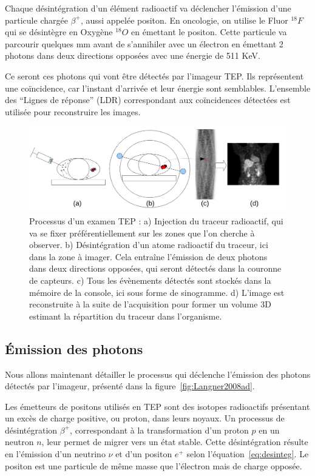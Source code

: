 Chaque désintégration d'un élément radioactif va déclencher l'émission d'une particule chargée $\beta^+$, aussi appelée positon. En oncologie, on utilise le Fluor $^{18}F$ qui se désintègre en Oxygène $^{18}O$ en émettant le positon. Cette particule va parcourir quelques mm avant de s'annihiler avec un électron en émettant 2 photons dans deux directions opposées avec une énergie de 511 KeV.

Ce seront ces photons qui vont être détectés par l'imageur TEP. Ils représentent une coïncidence, car l'instant d'arrivée et leur énergie sont semblables. L'ensemble des ``Lignes de réponse'' (LDR) correspondant aux coïncidences détectées est utilisée pour reconstruire les images.

\begin{figure}
\centering
\includegraphics[width=16cm]{images/schemaTEP}
\caption[Présentation simplifiée de la TEP]{Processus d'un examen TEP : a) Injection du traceur radioactif, qui va se fixer préférentiellement sur les zones que l'on cherche à observer. b) Désintégration d'un atome radioactif du traceur, ici dans la zone à imager. Cela entraîne l'émission de deux photons dans deux directions opposées, qui seront détectés dans la couronne de capteurs. c) Tous les évènements détectés sont stockés dans la mémoire de la console, ici sous forme de sinogramme. d) L'image est reconstruite à la suite de l'acquisition pour former un volume 3D estimant la répartition du traceur dans l'organisme.}
\label{fig:schemaTEP}
\end{figure}

	\subsection{\'Emission des photons}

Nous allons maintenant détailler le processus qui déclenche l'émission des photons détectés par l'imageur, présenté dans la figure~\ref{fig:Langner2008ad}.

Les émetteurs de positons utilisés en TEP sont des isotopes radioactifs présentant un excès de charge positive, ou proton, dans leurs noyaux. Un processus de désintégration $\beta^+$, correspondant à la transformation d’un proton $p$ en un neutron $n$, leur permet de migrer vers un état stable. Cette désintégration résulte en l’émission d’un neutrino $\nu$ et d’un positon $e^+$ selon l’équation~\ref{eq:desinteg}. Le positon est une particule de même masse que l’électron mais de charge opposée.

